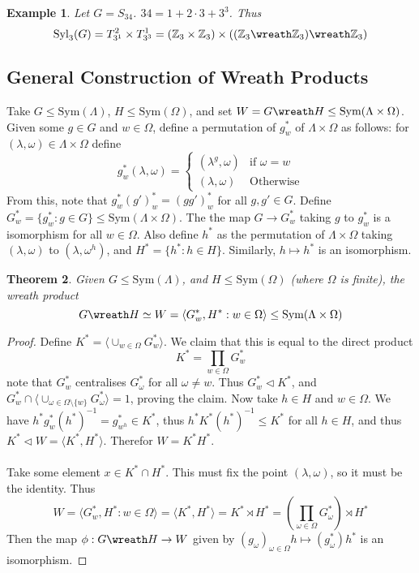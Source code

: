 \documentclass[a4paper,10pt]{article}
\newcommand{\ZZ}{\mathbb{Z}}
\newtheorem{thm}{Theorem}
\newtheorem{eg}[thm]{Example}
\begin{document}
\begin{eg}
Let $G = S_{34}$. $34 = 1 + 2 \cdot 3 + 3^3$. Thus
\[ \text{Syl}_3(G) = T_{3^1}^2 \times T_{3^3}^1 = (\ZZ_3 \times \ZZ_3) \times (( \ZZ_3 \wreath \ZZ_3) \wreath \ZZ_3) \]
\end{eg}

\subsection{General Construction of Wreath Products}

Take $G \leq \text{Sym}(\Lambda)$, $H \leq \text{Sym}(\Omega)$, and set $W = G \wreath H \leq \text{Sym}( \Lambda \times \Omega)$. Given some $g \in G$ and $w \in \Omega$, define a permutation of $g^*_w$ of $\Lambda \times \Omega$ as follows: for $(\lambda, \omega) \in \Lambda \times \Omega$ define 
\[ g^*_w (\lambda, \omega) = \begin{cases} (\lambda^g, \omega) &\text{if } \omega = w \\ (\lambda, \omega) &\text{Otherwise} \end{cases} \]
From this, note that $g_w^* (g')^*_w = (gg')^*_w$ for all $g, g' \in G$. Define $G^*_w = \{ g^*_w : g \in G \} \leq \text{Sym}(\Lambda \times \Omega)$. The the map $G \rightarrow G^*_w$ taking $g$ to $g^*_w$ is a isomorphism for all $w \in \Omega$. Also define $h^*$ as the permutation of $\Lambda \times \Omega$ taking $(\lambda, \omega)$ to $(\lambda, \omega^h)$, and $H^* = \{ h^* :  h \in H \}$. Similarly, $h \mapsto h^*$ is an isomorphism.

\begin{thm}
Given $G \leq \text{Sym}(\Lambda)$, and $H \leq \text{Sym}(\Omega)$ (where $\Omega$ is finite), the wreath product
\[ G \wreath H \simeq W = \langle G^*_w, H^* : w \in \Omega \rangle \leq \text{Sym}(\Lambda \times \Omega) \]
\end{thm}
\begin{proof}
Define $K^* = \langle \cup_{w \in \Omega} G^*_w \rangle$. We claim that this is equal to the direct product
\[ K^* = \prod_{w \in \Omega} G^*_w \]
note that $G^*_w$ centralises $G^*_\omega$ for all $\omega \neq w$. Thus $G^*_w \triangleleft K^*$, and $G^*_w \cap \langle \cup_{\omega \in \Omega \setminus \{ w \}} G^*_\omega \rangle = 1$, proving the claim. Now take $h \in H$ and $w \in \Omega$. We have $h^* g^*_w (h^*)^{-1} = g^*_{w^h} \in K^*$, thus $h^* K^* (h^*)^{-1} \leq K^*$ for all $h \in H$, and thus $K^* \triangleleft W = \langle K^*, H^* \rangle$. Therefor $W = K^* H^*$. \\
\\
Take some element $x \in K^* \cap H^*$. This must fix the point $(\lambda, \omega)$, so it must be the identity. Thus
\[ W = \langle G^*_w, H^* : w \in \Omega \rangle = \langle K^*, H^* \rangle = K^* \rtimes H^* = \left( \prod_{\omega \in \Omega} G^*_\omega \right) \rtimes H^*\]
Then the map $\phi : G \wreath H \rightarrow W$ given by $(g_\omega)_{\omega \in \Omega}h \mapsto (g^*_\omega)h^*$ is an isomorphism.
\end{proof}
\end{document}

